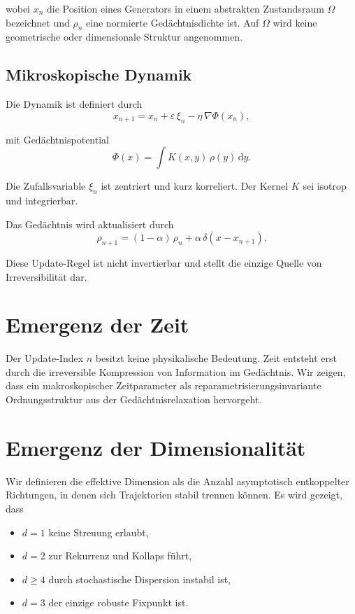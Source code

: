 \documentclass[11pt,a4paper]{article}
\renewcommand{\dd}{\mathrm{d}}
\begin{document}
wobei $x_n$ die Position eines Generators in einem abstrakten Zustandsraum $\Omega$ bezeichnet und $\rho_n$ eine normierte Gedächtnisdichte ist. Auf $\Omega$ wird keine geometrische oder dimensionale Struktur angenommen.

\subsection{Mikroskopische Dynamik}

Die Dynamik ist definiert durch
\begin{equation}
 x_{n+1} = x_n + \varepsilon \, \xi_n - \eta \, \nabla \Phi(x_n),
\end{equation}

mit Gedächtnispotential
\begin{equation}
 \Phi(x) = \int K(x,y)\, \rho(y)\, \dd y.
\end{equation}

Die Zufallsvariable $\xi_n$ ist zentriert und kurz korreliert. Der Kernel $K$ sei isotrop und integrierbar.

Das Gedächtnis wird aktualisiert durch
\begin{equation}
 \rho_{n+1} = (1-\alpha)\, \rho_n + \alpha \, \delta(x-x_{n+1}).
\end{equation}

Diese Update-Regel ist nicht invertierbar und stellt die einzige Quelle von Irreversibilität dar.

\section{Emergenz der Zeit}

Der Update-Index $n$ besitzt keine physikalische Bedeutung. Zeit entsteht erst durch die irreversible Kompression von Information im Gedächtnis. Wir zeigen, dass ein makroskopischer Zeitparameter als reparametrisierungsinvariante Ordnungsstruktur aus der Gedächtnisrelaxation hervorgeht.

\section{Emergenz der Dimensionalit\"at}

Wir definieren die effektive Dimension als die Anzahl asymptotisch entkoppelter Richtungen, in denen sich Trajektorien stabil trennen können. Es wird gezeigt, dass
\begin{itemize}
 \item $d=1$ keine Streuung erlaubt,
 \item $d=2$ zur Rekurrenz und Kollaps f\"uhrt,
 \item $d\geq 4$ durch stochastische Dispersion instabil ist,
 \item $d=3$ der einzige robuste Fixpunkt ist.
\end{itemize}
\end{document}
